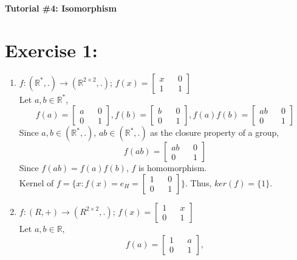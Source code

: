 \documentclass{article}
\newcommand{\R}{\mathbb{R}}
\begin{document}
	\centering
	\LARGE\textbf{Tutorial \#4: Isomorphism}\\
	
	\justify\Large
	
	\section{Exercise 1:}
		\begin{enumerate}
			\item $f: (\R^*, .) \rightarrow (\R^{2\times2}, .)$; $f(x)= \begin{bmatrix}
				x && 0\\
				1 && 1
			\end{bmatrix}$\\ 
			Let $a,b \in \R^*$, \[
			f(a) = \begin{bmatrix}
						a && 0\\
						0 && 1
	  		\end{bmatrix},
	  		f(b) = \begin{bmatrix}
		  				b && 0\\
		  				0 && 1
	  		\end{bmatrix},
	  		f(a)f(b) = \begin{bmatrix}
		  				ab && 0\\
		  				0 && 1
	  		\end{bmatrix}	   
	  		\]
	  		Since $a,b \in (\R^*, .)$, $ab \in (\R^*, .)$ as the closure property of a group,
	  		\[
	  		f(ab) = \begin{bmatrix}
	  					ab && 0\\
	  					0 && 1
	  		\end{bmatrix}
	  		\]
	  		Since $f(ab) = f(a)f(b)$, $f$ is homomorphism.\\
	  		Kernel of $f = \{x: f(x) = e_H = \begin{bmatrix}
		  										1 && 0\\
		  										0 && 1
	  		\end{bmatrix}\}$. Thus, $ker(f) = \{1\}$.
	  		\item $f: (R, +) \rightarrow (R^{2\times2}, .)$; $f(x) = \begin{bmatrix}
	  			1 && x\\
	  			0 && 1
	  		\end{bmatrix}$\\
	  		Let $a, b \in \R$,
	  		\[
	  		f(a) = \begin{bmatrix}
	  			1 && a\\
	  			0 && 1
	  		\end{bmatrix},
\]
\end{enumerate}
\end{document}
